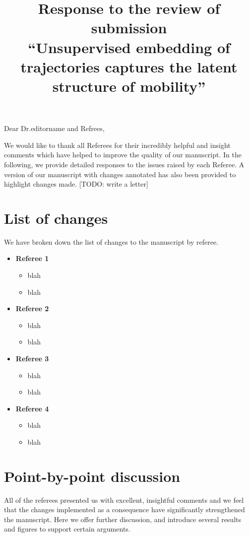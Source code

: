 \documentclass[12pt,a4paper]{article}
\title{Response to the review of submission\\  ``Unsupervised embedding of trajectories captures the latent structure of mobility''}
\date{}
\makeatletter
\newcommand{\todo}[1]{{\leavevmode\color{orange}[TODO: #1]}}
\renewcommand{\maketitle}{\bgroup\setlength{\parindent}{0pt}
\begin{flushleft}
\Large  \textbf{\@title}
\end{flushleft}\egroup
}
\makeatother
\begin{document}
\maketitle

\noindent Dear Dr.editorname and Refrees,


We would like to thank all Referees for their incredibly helpful and insight comments which have helped to improve the quality of our manuscript.
In the following, we provide detailed responses to the issues raised by each Referee.
A version of our manuscript with changes annotated has also been provided to highlight changes made.
\todo{write a letter}

\tableofcontents
\listoffigures


\section{List of changes}

We have broken down the list of changes to the manuscript by referee.

\begin{itemize} 
\item \textbf{Referee 1} 
     \begin{itemize} 
        \item blah
        \item blah
     \end{itemize}
\item \textbf{Referee 2} 
     \begin{itemize} 
        \item blah
        \item blah
     \end{itemize}
\item \textbf{Referee 3} 
     \begin{itemize} 
        \item blah
        \item blah
     \end{itemize}
 \item \textbf{Referee 4} 
     \begin{itemize} 
        \item blah
        \item blah
     \end{itemize}
\end{itemize}



\section{Point-by-point discussion}
All of the referees presented us with excellent, insightful comments and we feel that the changes implemented as a consequence have signiﬁcantly strengthened the manuscript. Here we offer further discussion, and introduce several results and figures to support certain arguments.
\end{document}
